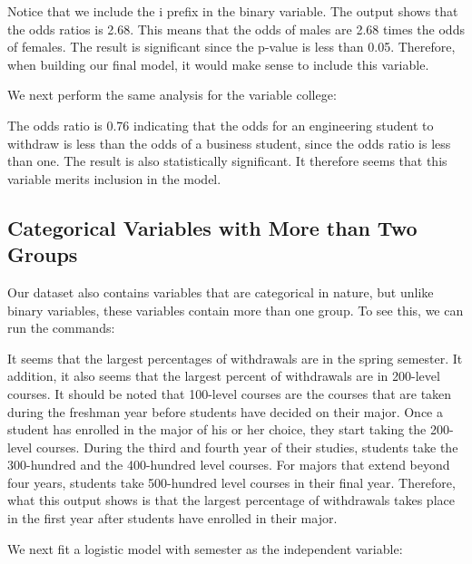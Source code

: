 \documentclass[a4paper,12pt,oneside]{book}
\begin{document}
\begin{stlog}\end{stlog}

Notice that we include the i prefix in the binary variable. The output shows that the odds ratios is 2.68. This means that the odds of males are 2.68 times the odds of females. The result is significant since 
the p-value is less than 0.05. Therefore, when building our final model, it would make sense to include this variable.

We next perform the same analysis for the variable college:

\begin{stlog}\end{stlog}

The odds ratio is 0.76 indicating that the odds for an engineering student to withdraw is less than the odds of a business student, since the odds ratio is less than one. The result is also 
statistically significant. It therefore seems that this variable merits inclusion in the model.
\subsection{Categorical Variables with More than Two Groups} 
Our dataset also contains variables that are categorical in nature, but unlike binary variables, these variables contain more than one group. To see this, we can run the commands:

\begin{stlog}\end{stlog}

It seems that the largest percentages of withdrawals are in the spring semester. It addition, it also seems that the largest percent of withdrawals are in 200-level courses. 
It should be noted that 100-level courses are the courses that are taken during the freshman year before students have decided on their major. Once a student has enrolled in the major of 
his or her choice, they start taking the 200-level courses. During the third and fourth year of their studies, students take the 300-hundred and the 400-hundred level courses. For majors 
that extend beyond four years, students take 500-hundred level courses in their final year. Therefore, what this output shows is that the largest percentage of withdrawals takes place in 
the first year after students have enrolled in their major.

We next fit a logistic model with semester as the independent variable:
\end{document}

